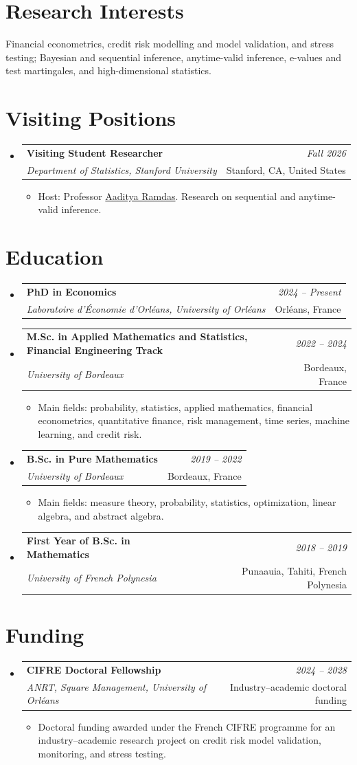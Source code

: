 \documentclass[a4paper,11pt]{article}
\makeatletter
\newcommand{\resumeSubheading}[4]{
\vspace{0.5mm}\item
    \begin{tabular*}{0.98\textwidth}[t]{l@{\extracolsep{\fill}}r}
        \textbf{#1} & \textit{\footnotesize{#4}} \\
        \textit{\footnotesize{#3}} &  \footnotesize{#2}\\
    \end{tabular*}
    \vspace{-2.4mm}
}
\newcommand{\resumeProject}[4]{
\vspace{0.5mm}\item
    \begin{tabularx}{0.98\textwidth}[t]{X r}
        \textbf{#1} & \textit{\footnotesize{#3}} \\
        \footnotesize{\textit{#2}} & \footnotesize{#4}
    \end{tabularx}
    \vspace{-2.4mm}
}
\newcommand{\resumeSubHeadingListStart}{\begin{itemize}[leftmargin=*,labelsep=1mm]}
\newcommand{\resumeItemListStart}{\begin{itemize}[leftmargin=*,labelsep=1mm,itemsep=0.5mm]\small}
\newcommand{\resumeSubHeadingListEnd}{\end{itemize}\vspace{2mm}}
\newcommand{\resumeItemListEnd}{\end{itemize}\vspace{-2mm}}
\makeatother
\begin{document}
\section{\textbf{Research Interests}}
\vspace{1mm}
{\small
Financial econometrics, credit risk modelling and model validation, and stress testing; Bayesian and sequential inference, anytime-valid inference, e-values and test martingales, and high-dimensional statistics.
}
\vspace{-2mm}
\section{\textbf{Visiting Positions}}
\vspace{-0.4mm}
\resumeSubHeadingListStart
\resumeSubheading
{Visiting Student Researcher}{Stanford, CA, United States}
{Department of Statistics, Stanford University}{Fall 2026}
\resumeItemListStart
\item Host: Professor \href{https://www.stat.cmu.edu/~aramdas/}{Aaditya Ramdas}. Research on sequential and anytime-valid inference.
\resumeItemListEnd
\resumeSubHeadingListEnd
\vspace{-6mm}
\section{\textbf{Education}}
\vspace{-0.4mm}
\resumeSubHeadingListStart
\resumeSubheading
{PhD in Economics}{Orléans, France}
{Laboratoire d'Économie d'Orléans, University of Orléans}{2024 -- Present}
\resumeSubheading
{M.Sc. in Applied Mathematics and Statistics, Financial Engineering Track}{Bordeaux, France}
{University of Bordeaux}{2022 -- 2024}
\resumeItemListStart
\item Main fields: probability, statistics, applied mathematics, financial econometrics, quantitative finance, risk management, time series, machine learning, and credit risk.
\resumeItemListEnd
\resumeSubheading
{B.Sc. in Pure Mathematics}{Bordeaux, France}
{University of Bordeaux}{2019 -- 2022}
\resumeItemListStart
\item Main fields: measure theory, probability, statistics, optimization, linear algebra, and abstract algebra.
\resumeItemListEnd
\resumeSubheading
{First Year of B.Sc. in Mathematics}{Punaauia, Tahiti, French Polynesia}
{University of French Polynesia}{2018 -- 2019}
\resumeSubHeadingListEnd
\vspace{-6mm}
\section{\textbf{Funding}}
\vspace{-0.4mm}
\resumeSubHeadingListStart
\resumeProject
  {CIFRE Doctoral Fellowship}
  {ANRT, Square Management, University of Orléans}
  {2024 -- 2028}
  {Industry--academic doctoral funding}
\resumeItemListStart
\item Doctoral funding awarded under the French CIFRE programme for an industry--academic research project on credit risk model validation, monitoring, and stress testing.
\resumeItemListEnd
\resumeSubHeadingListEnd
\vspace{-6mm}
\end{document}
